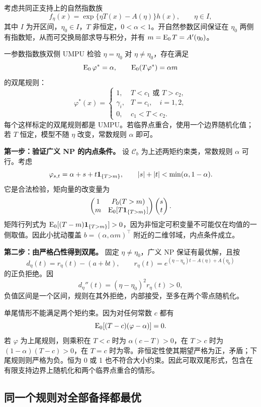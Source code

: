 考虑共同正支持上的自然指数族
\[
 f_\eta(x)=\exp\{\eta T(x)-A(\eta)\}h(x),\qquad \eta\in I,
\]
其中 $I$ 为开区间，$\eta_0\in I$，$T$ 非恒定，$0<\alpha<1$。开自然参数区间保证在 $\eta_0$ 两侧有指数矩，从而可交换局部求导与积分，并有 $m=\operatorname{E}_0T=A'(\eta_0)$。

\begin{definitionbox}{一参数指数族双侧 UMPU}
检验 $\eta=\eta_0$ 对 $\eta\ne\eta_0$，存在满足
\[
 \operatorname{E}_0\varphi^*=\alpha,\qquad
 \operatorname{E}_0(T\varphi^*)=\alpha m
\]
的双尾规则：
\[
 \varphi^*(x)=
 \begin{cases}
 1,&T<c_1\text{ 或 }T>c_2,\\
 \gamma_i,&T=c_i,\quad i=1,2,\\
 0,&c_1<T<c_2.
 \end{cases}
\]
每个这样标定的双尾规则都是 UMPU。若临界点重合，使用一个边界随机化值；若 $T$ 恒定，模型不随 $\eta$ 改变，常数规则 $\alpha$ 即可。
\end{definitionbox}

\textbf{第一步：验证广义 NP 的内点条件。}
设 $\mathcal C_b$ 为上述两矩约束类，常数规则 $\alpha$ 可行。考虑
\[
 \varphi_{s,t}=\alpha+s+t\mathbf 1_{\{T>m\}},\qquad
 |s|+|t|<\min(\alpha,1-\alpha).
\]
它是合法检验，矩向量的改变量为
\[
 \begin{pmatrix}
 1&P_0(T>m)\\m&\operatorname{E}_0[T\mathbf 1_{\{T>m\}}]
 \end{pmatrix}
 \begin{pmatrix}s\\t\end{pmatrix}.
\]
矩阵行列式为 $\operatorname{E}_0[(T-m)\mathbf 1_{\{T>m\}}]>0$，因为非恒定可积变量不可能仅在均值的一侧取值。因此小扰动覆盖 $b=(\alpha,\alpha m)^\top$ 附近的二维邻域，内点条件成立。

\textbf{第二步：由严格凸性得到双尾。}
固定 $\eta\ne\eta_0$，广义 NP 保证有最优解，且按
\[
 d_\eta(t)=r_\eta(t)-(a+bt),\qquad
 r_\eta(t)=e^{(\eta-\eta_0)t-A(\eta)+A(\eta_0)}
\]
的正负拒绝。因
\[
 d_\eta''(t)=(\eta-\eta_0)^2r_\eta(t)>0,
\]
负值区间是一个区间，规则在其外拒绝，内部接受，至多在两个零点随机化。

单尾情形不能满足两个矩约束。因为对任何常数 $c$ 都有
\[
 \operatorname{E}_0[(T-c)(\varphi-\alpha)]=0.
\]
若 $\varphi$ 为上尾规则，则乘积在 $T<c$ 时为 $\alpha(c-T)>0$，在 $T>c$ 时为 $(1-\alpha)(T-c)>0$，在 $T=c$ 时为零。非恒定性使其期望严格为正，矛盾；下尾规则则严格为负。恒为 0 或 1 也不符合大小约束。因此可取双尾形式，包含在有限支持边界上随机化和两个临界点重合的情形。

\subsection{同一个规则对全部备择都最优}

